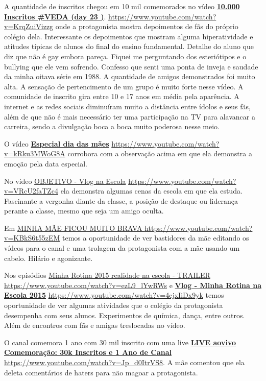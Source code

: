 A quantidade de inscritos chegou em 10 mil comemorados no vídeo \href{https://www.youtube.com/watch?v=KrqZuiVizzg}{\textbf{10.000 Inscritos \#VEDA (day 23 )}}. \url{https://www.youtube.com/watch?v=KrqZuiVizzg} onde a protagonista mostra depoimentos de fãs do próprio colégio dela. Interessante os depoimentos que mostram alguma hiperatividade e atitudes típicas de alunos do final do ensino fundamental. Detalhe do aluno que diz que não é gay embora pareça. Fiquei me perguntando dos esteriótipos e o bullying que ele vem sofrendo. Confesso que senti uma ponta de inveja e saudade da minha oitava série em 1988. A quantidade de amigos demonstrados foi muito alta. A sensação de pertencimento de um grupo é muito forte nesse vídeo. A comunidade de inscrito gira entre 10 e 17 anos em média pela aparência. A internet e as redes sociais diminuíram muito a distância entre ídolos e seus fãs, além de que não é mais necessário ter uma participação na TV para alavancar a carreira, sendo a divulgação boca a boca muito poderosa nesse meio.

O vídeo \href{https://www.youtube.com/watch?v=kRku3MWoG8A}{\textbf{Especial dia das mães}} \url{https://www.youtube.com/watch?v=kRku3MWoG8A} corrobora com a observação acima em que ela demonstra a emoção pela data especial.

No vídeo \href{https://www.youtube.com/watch?v=VRcU2faTZc4}{OBJETIVO - Vlog na Escola} \url{https://www.youtube.com/watch?v=VRcU2faTZc4} ela demonstra algumas cenas da escola em que ela estuda. Fascinante a vergonha diante da classe, a posição de destaque ou liderança perante a classe, mesmo que seja um amigo oculta.

Em \href{https://www.youtube.com/watch?v=KBkS6t55zEM}{MINHA MÃE FICOU MUITO BRAVA } \url{https://www.youtube.com/watch?v=KBkS6t55zEM} temos a oportunidade de ver bastidores da mãe editando os vídeos para o canal e uma trolagem da protagonista com a mãe usando um cabelo. Hilário e agonizante.

Nos episódios \href{https://www.youtube.com/watch?v=ezL9_lYwRWs}{Minha Rotina 2015 realidade na escola - TRAILER} \url{https://www.youtube.com/watch?v=ezL9_lYwRWs} e \href{https://www.youtube.com/watch?v=4cjxIiDx9yk}{\textbf{Vlog - Minha Rotina na Escola 2015}} \url{https://www.youtube.com/watch?v=4cjxIiDx9yk} temos oportunidade de ver algumas atividades que o colégio da protagonista desempenha com seus alunos. Experimentos de química, dança, entre outros. Além de encontros com fãs e amigas treslocadas no vídeo.

O canal comemora 1 ano com 30 mil inscrito com uma live \href{https://www.youtube.com/watch?v=Jp_d0ItrVS8}{\textbf{LIVE aovivo Comemoração: 30k Inscritos e 1 Ano de Canal}} \url{https://www.youtube.com/watch?v=Jp_d0ItrVS8}. A mãe comentou que ela deleta comentários de haters para não magoar a protagonista.

